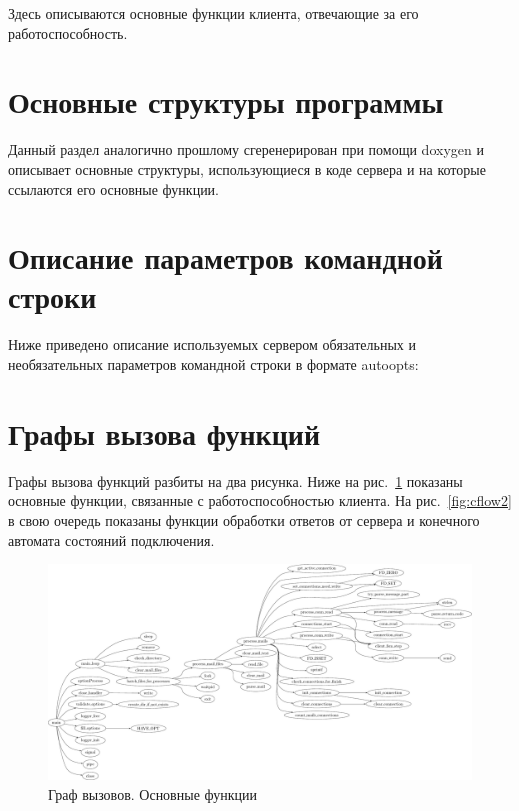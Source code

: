 \documentclass[a4paper,12pt]{report}
\begin{document}
Здесь описываются основные функции клиента, отвечающие за его работоспособность.




\section{Основные структуры программы}

Данный раздел аналогично прошлому сгеренерирован при помощи doxygen и описывает основные структуры, использующиеся в коде сервера и на которые ссылаются его основные функции.

%
%
%


\section{Описание параметров командной строки}

Ниже приведено описание используемых сервером обязательных и необязательных параметров командной строки в формате autoopts:



\section{Графы вызова функций}

Графы вызова функций разбиты на два рисунка. Ниже на рис.~\ref{fig:cflow1} показаны основные функции, связанные с работоспособностью клиента. На рис.~\ref{fig:cflow2} в свою очередь показаны функции обработки ответов от сервера и конечного автомата состояний подключения.

\begin{figure}[h]
\includegraphics[width=1.1\textwidth]{include/cflow_main_dot.pdf}
\caption{Граф вызовов. Основные функции}
\label{fig:cflow1}
\end{figure}
\end{document}
